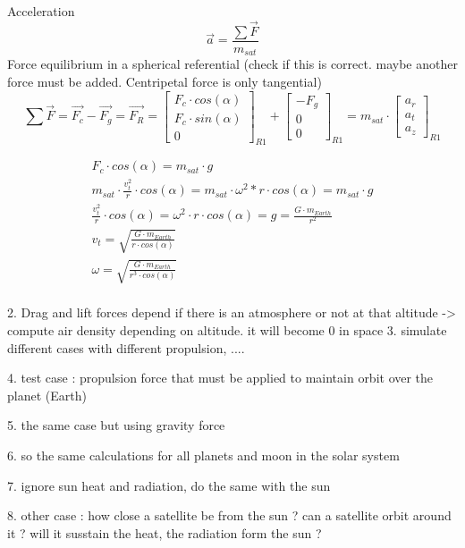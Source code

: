 \documentclass[12pt,a4paper]{article}
\begin{document}
Acceleration
\begin{equation}
	\vec{a}=\frac{\sum \vec{F}}{m_{sat}}
\end{equation}
Force equilibrium in a spherical referential (check if this is correct. maybe another force must be added. Centripetal force is only tangential)
\begin{equation}
	\sum \vec{F}=\vec{F_{c}}-\vec{F_g} = \vec{F_R} = 
	\begin{bmatrix}
		F_c\cdot cos(\alpha) \\
		F_c\cdot sin(\alpha)\\
		0
	\end{bmatrix}_{R1} + 
	\begin{bmatrix}
		- F_g \\
		0\\
		0
	\end{bmatrix}_{R1} = m_{sat} \cdot	\begin{bmatrix}
		a_r \\
		a_t\\
		a_z
	\end{bmatrix}_{R1}
\end{equation}

\begin{eqnarray}
	F_c\cdot cos(\alpha) = m_{sat} \cdot g \\
	m_{sat} \cdot \frac{v_t^2}{r} \cdot cos(\alpha) = m_{sat} \cdot \omega^2 * r \cdot cos(\alpha)= m_{sat} \cdot g\\
	\frac{v_t^2}{r} \cdot cos(\alpha) = \omega^2 \cdot r \cdot cos(\alpha) = g =\frac{ G \cdot m_{Earth}}{r^2}\\
	v_t = \sqrt{\frac{ G \cdot m_{Earth}}{r\cdot cos(\alpha)}}\\
	\omega = \sqrt{\frac{ G \cdot m_{Earth}}{r^3\cdot cos(\alpha)}}\\
\end{eqnarray}

2. Drag and lift forces depend if there is an atmosphere or not at that altitude
-> compute air density depending on altitude. it will become 0 in space
3. simulate different cases with different propulsion, ....

4. test case : propulsion force that must be applied to maintain orbit over the planet (Earth)

5. the same case but using gravity force

6. so the same calculations for all planets and moon in the solar system

7. ignore sun heat and radiation, do the same with the sun 


8. other case : how close a satellite be from the sun ? can a satellite orbit around it ? will it susstain the heat, the radiation form the sun ?
\end{document}
